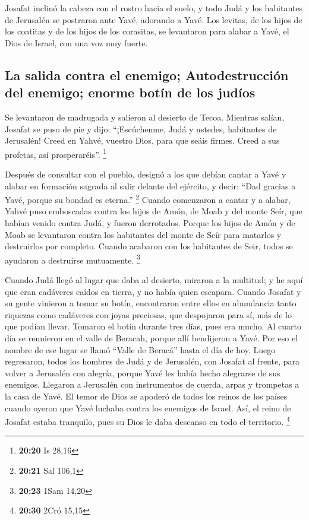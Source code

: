 \begin{paracol}{2}
 Josafat inclinó la cabeza con el rostro hacia el suelo,
y todo Judá y los habitantes de Jerusalén se postraron ante Yavé,
adorando a Yavé.  Los levitas, de los hijos de los
coatitas y de los hijos de los corasitas, se levantaron para alabar a
Yavé, el Dios de Israel, con una voz muy fuerte.

\hypertarget{la-salida-contra-el-enemigo-autodestrucciuxf3n-del-enemigo-enorme-botuxedn-de-los-juduxedos}{%
\subsection{La salida contra el enemigo; Autodestrucción del enemigo;
enorme botín de los
judíos}\label{la-salida-contra-el-enemigo-autodestrucciuxf3n-del-enemigo-enorme-botuxedn-de-los-juduxedos}}

 Se levantaron de madrugada y salieron al desierto de
Tecoa. Mientras salían, Josafat se puso de pie y dijo: ``¡Escúchenme,
Judá y ustedes, habitantes de Jerusalén! Creed en Yahvé, vuestro Dios,
para que seáis firmes. Creed a sus profetas, así prosperaréis''.
\footnote{\textbf{20:20} Is 28,16}

 Después de consultar con el pueblo, designó a los que
debían cantar a Yavé y alabar en formación sagrada al salir delante del
ejército, y decir: ``Dad gracias a Yavé, porque su bondad es eterna.''
\footnote{\textbf{20:21} Sal 106,1}  Cuando comenzaron a
cantar y a alabar, Yahvé puso emboscadas contra los hijos de Amón, de
Moab y del monte Seír, que habían venido contra Judá, y fueron
derrotados.  Porque los hijos de Amón y de Moab se
levantaron contra los habitantes del monte de Seír para matarlos y
destruirlos por completo. Cuando acabaron con los habitantes de Seir,
todos se ayudaron a destruirse mutuamente. \footnote{\textbf{20:23} 1Sam
  14,20}

 Cuando Judá llegó al lugar que daba al desierto, miraron
a la multitud; y he aquí que eran cadáveres caídos en tierra, y no había
quien escapara.  Cuando Josafat y su gente vinieron a
tomar su botín, encontraron entre ellos en abundancia tanto riquezas
como cadáveres con joyas preciosas, que despojaron para sí, más de lo
que podían llevar. Tomaron el botín durante tres días, pues era mucho.
 Al cuarto día se reunieron en el valle de Beracah,
porque allí bendijeron a Yavé. Por eso el nombre de ese lugar se llamó
``Valle de Beracá'' hasta el día de hoy.  Luego
regresaron, todos los hombres de Judá y de Jerusalén, con Josafat al
frente, para volver a Jerusalén con alegría, porque Yavé les había hecho
alegrarse de sus enemigos.  Llegaron a Jerusalén con
instrumentos de cuerda, arpas y trompetas a la casa de Yavé.
 El temor de Dios se apoderó de todos los reinos de los
países cuando oyeron que Yavé luchaba contra los enemigos de Israel.
 Así, el reino de Josafat estaba tranquilo, pues su Dios
le daba descanso en todo el territorio. \footnote{\textbf{20:30} 2Cró
  15,15}


\end{paracol}
